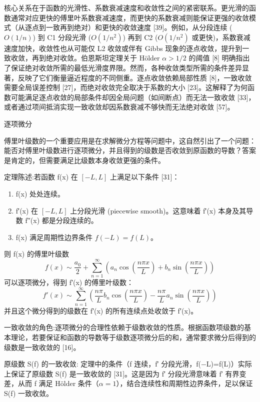 核心关系在于函数的光滑性、系数衰减速度和收敛性之间的紧密联系。更光滑的函数通常对应更快的傅里叶系数衰减速度，而更快的系数衰减则能保证更强的收敛模式（从逐点到一致再到绝对）和更快的收敛速度 [39]。例如，从分段连续 ($O(1/n)$) 到 C1 分段光滑 ($O(1/n^2)$) 再到 C2 ($O(1/n^2)$ 或更快)，系数衰减速度加快，收敛性也从可能仅 L2 收敛或伴有 Gibbs 现象的逐点收敛，提升到一致收敛，再到绝对收敛。伯恩斯坦定理关于 Hölder $\alpha>1/2$ 的阈值 [8] 明确指出了保证绝对收敛所需的最低光滑度界限。然而，各种收敛类型所需的条件差异显著，反映了它们衡量逼近程度的不同侧重。逐点收敛依赖局部性质 [8]，一致收敛需要全局误差控制 [27]，而绝对收敛完全取决于系数的大小 [23]。这解释了为何函数可能满足逐点收敛的局部条件却因全局问题（如间断点）而无法一致收敛 [33]，或者通过项间抵消实现一致收敛却因系数衰减不够快而无法绝对收敛 [57]。

逐项微分

傅里叶级数的一个重要应用是在求解微分方程等问题中，这自然引出了一个问题：能否对傅里叶级数进行逐项微分，并且得到的级数是否收敛到原函数的导数？答案是肯定的，但需要满足比级数本身收敛更强的条件。

\begin{theorem}[Statement]
定理陈述:若函数 f(x) 在 $[−L,L]$ 上满足以下条件 [31]：
	\begin{enumerate}
		\item f(x) 处处连续。
		\item f′(x) 在 $[−L,L]$ 上分段光滑 (piecewise smooth)。这意味着 f′(x) 本身及其导数 f′′(x) 都是分段连续的。
		\item f(x) 满足周期性边界条件 $f(−L)=f(L)$。
	\end{enumerate}
则 f(x) 的傅里叶级数
\[
f(x) \sim \frac{a_0}{2} + \sum_{n=1}^{\infty} \left( a_n \cos\left(\frac{n\pi x}{L}\right) + b_n \sin\left(\frac{n\pi x}{L}\right) \right)
\]可以逐项微分，得到 f′(x) 的傅里叶级数：
\[
f'(x) \sim \sum_{n=1}^{\infty} \left( \frac{n\pi}{L} b_n \cos\left(\frac{n\pi x}{L}\right) - \frac{n\pi}{L} a_n \sin\left(\frac{n\pi x}{L}\right) \right)
\]并且这个微分得到的级数在 f′(x) 的所有连续点处收敛于 f′(x)。
\end{theorem}
一致收敛的角色:逐项微分的合理性依赖于级数收敛的性质。根据函数项级数的基本理论，若要保证和函数的导数等于级数逐项微分后的和，通常要求微分后得到的级数是一致收敛的 [16]。

原级数 S(f) 的一致收敛: 定理中的条件（f 连续，f′ 分段光滑，f(−L)=f(L)）实际上保证了原级数 S(f) 是一致收敛的 [31]。这是因为 f′ 分段光滑意味着 f′ 有界变差，从而 f 满足 Hölder 条件（$\alpha=1$），结合连续性和周期性边界条件，足以保证 S(f) 一致收敛。


